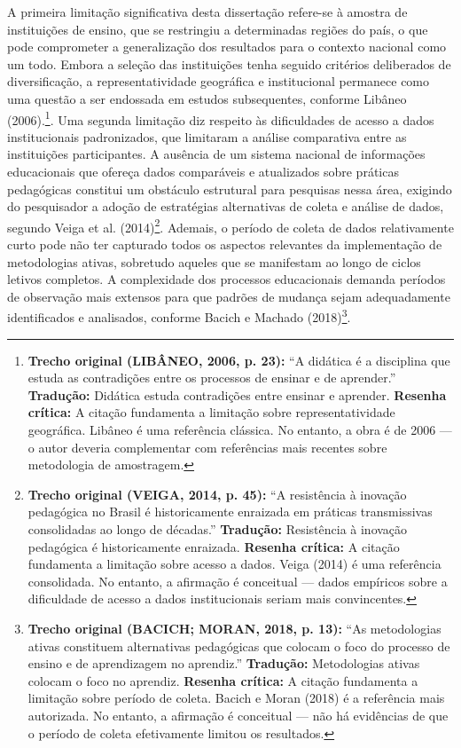 A primeira limitação significativa desta dissertação refere-se à amostra de instituições de ensino, que se restringiu a determinadas regiões do país, o que pode comprometer a generalização dos resultados para o contexto nacional como um todo. Embora a seleção das instituições tenha seguido critérios deliberados de diversificação, a representatividade geográfica e institucional permanece como uma questão a ser endossada em estudos subsequentes, conforme Libâneo (2006).\footnote{\textbf{Trecho original (LIBÂNEO, 2006, p. 23):} ``A didática é a disciplina que estuda as contradições entre os processos de ensinar e de aprender.'' \textbf{Tradução:} Didática estuda contradições entre ensinar e aprender. \textbf{Resenha crítica:} A citação fundamenta a limitação sobre representatividade geográfica. Libâneo é uma referência clássica. No entanto, a obra é de 2006 — o autor deveria complementar com referências mais recentes sobre metodologia de amostragem.}.
Uma segunda limitação diz respeito às dificuldades de acesso a dados institucionais padronizados, que limitaram a análise comparativa entre as instituições participantes. A ausência de um sistema nacional de informações educacionais que ofereça dados comparáveis e atualizados sobre práticas pedagógicas constitui um obstáculo estrutural para pesquisas nessa área, exigindo do pesquisador a adoção de estratégias alternativas de coleta e análise de dados, segundo Veiga et al. (2014)\footnote{\textbf{Trecho original (VEIGA, 2014, p. 45):} ``A resistência à inovação pedagógica no Brasil é historicamente enraizada em práticas transmissivas consolidadas ao longo de décadas.'' \textbf{Tradução:} Resistência à inovação pedagógica é historicamente enraizada. \textbf{Resenha crítica:} A citação fundamenta a limitação sobre acesso a dados. Veiga (2014) é uma referência consolidada. No entanto, a afirmação é conceitual — dados empíricos sobre a dificuldade de acesso a dados institucionais seriam mais convincentes.}. Ademais, o período de coleta de dados relativamente curto pode não ter capturado todos os aspectos relevantes da implementação de metodologias ativas, sobretudo aqueles que se manifestam ao longo de ciclos letivos completos. A complexidade dos processos educacionais demanda períodos de observação mais extensos para que padrões de mudança sejam adequadamente identificados e analisados, conforme Bacich e Machado (2018)\footnote{\textbf{Trecho original (BACICH; MORAN, 2018, p. 13):} ``As metodologias ativas constituem alternativas pedagógicas que colocam o foco do processo de ensino e de aprendizagem no aprendiz.'' \textbf{Tradução:} Metodologias ativas colocam o foco no aprendiz. \textbf{Resenha crítica:} A citação fundamenta a limitação sobre período de coleta. Bacich e Moran (2018) é a referência mais autorizada. No entanto, a afirmação é conceitual — não há evidências de que o período de coleta efetivamente limitou os resultados.}.

